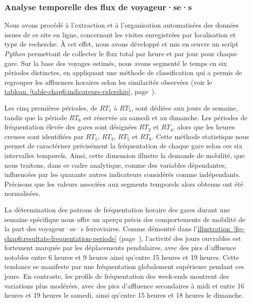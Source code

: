 \begin{refsegment}
\subsubsection*{Analyse temporelle des flux de voyageur·se·s
    \label{chap6:methodologie-indicateurs-frequentation-extraction}
    }

Nous avons procédé à l'extraction et à l'organisation automatisées des données issues de ce site en ligne, concernant les visites enregistrées par localisation et type de recherche. À cet effet, nous avons développé et mis en œuvre un script \textsl{Python} permettant de collecter le flux total par heure et par jour pour chaque gare. Sur la base des voyages estimés, nous avons segmenté le temps en six périodes distinctes, en appliquant une méthode de classification qui a permis de regrouper les affluences horaires selon les similarités observées (voir le \hyperref[table-chap6:indicateurs-ridership]{tableau~\ref{table-chap6:indicateurs-ridership}}, page~\pageref{table-chap6:indicateurs-ridership}).%


Les cinq premières périodes, de \(RT_{1}\) à \(RT_{5}\), sont dédiées aux jours de semaine, tandis que la période \(RT_{6}\) est réservée au samedi et au dimanche. Les périodes de fréquentation élevée des gares sont désignées \(RT_{2}\) et \(RT_{4}\), alors que les heures creuses sont identifiées par \(RT_{1}\), \(RT_{3}\), \(RT_{5}\) et \(RT_{6}\). Cette méthode statistique nous permet de caractériser précisément la fréquentation de chaque gare selon ces six intervalles temporels. Ainsi, cette dimension illustre la demande de mobilité, que nous traitons, dans ce cadre analytique, comme des variables dépendantes, influencées par les quarante autres indicateurs considérés comme indépendants. Précisons que les valeurs associées aux segments temporels alors obtenus ont été normalisées.%

La détermination des patrons de fréquentation horaire des gares durant une semaine spécifique nous offre un aperçu précis des comportements de mobilité de la part des voyageur·se·s ferroviaires. Comme démontré dans l'\hyperref[fig-chap6:resultats-frequentation-periode]{illustration~\ref{fig-chap6:resultats-frequentation-periode}} (page~\pageref{fig-chap6:resultats-frequentation-periode}), l'activité des jours ouvrables est fortement marquée par les déplacements pendulaires, avec des pics d'affluence notables entre 6 heures et 9 heures ainsi qu'entre 15 heures et 19 heures. Cette tendance se manifeste par une fréquentation globalement supérieure pendant ces jours. En contraste, les profils de fréquentation des week-ends montrent des variations plus modérées, avec des pics d'affluence secondaires à midi et entre 16 heures et 19 heures le samedi, ainsi qu'entre 15 heures et 18 heures le dimanche.%


\end{refsegment}
